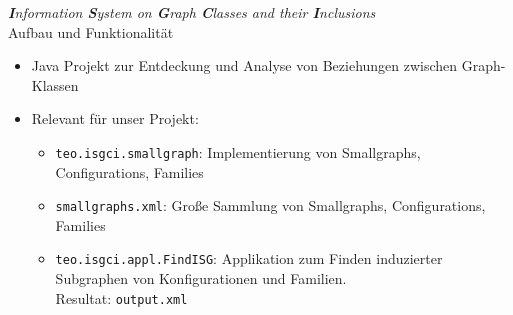 \newcommand{\hl}[1]{\textbf{\LARGE#1}}

\begin{frame}{{\it\hl{I}{\large nformation} \hl{S}{\large ystem on} \hl{G}{\large raph}
  \hl{C}{\large lasses and their} \hl{I}{\large nclusions}}\\Aufbau und Funktionalität}{}
	\begin{itemize}
	  \item Java Projekt zur Entdeckung und Analyse von Beziehungen zwischen Graph-Klassen
	  \item Relevant für unser Projekt:
	  \begin{itemize}
	    \setlength\itemsep{1em}
	    \item {\tt teo.isgci.smallgraph}: Implementierung von Smallgraphs, Configurations, Families
	    \item {\tt smallgraphs.xml}: Große Sammlung von Smallgraphs, Configurations, Families
	    \item {\tt teo.isgci.appl.FindISG}: Applikation zum Finden induzierter Subgraphen von
	      Konfigurationen und Familien. \\
	      Resultat: {\tt output.xml}
	  \end{itemize}
	\end{itemize}
\end{frame}
